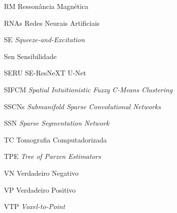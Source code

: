 \documentclass[
	12pt,				%
	openright,			%
	oneside,			%
	a4paper,			%
	chapter=TITLE,		%
	english,			%
	french,				%
	spanish,			%
	brazil				%
	]{abntex2}
\begin{document}
\begin{siglas}
    \item[RM] Ressonância Magnética
    \item[RNAs] Redes Neurais Artificiais
    \item[SE] \textit{Squeeze-and-Excitation}
    \item[Sen] Sensibilidade
    \item[SERU] SE-ResNeXT U-Net
    \item[SIFCM] \textit{Spatial Intuitionistic Fuzzy C-Means Clustering}
    \item[SSCNs] \textit{Submanifold Sparse Convolutional Networks}
    \item[SSN] \textit{Sparse Segmentation Network}
    \item[TC] Tomografia Computadorizada
    \item[TPE] \textit{Tree of Parzen Estimators}
    \item[VN] Verdadeiro Negativo
    \item[VP] Verdadeiro Positivo
    \item[VTP] \textit{Voxel-to-Point}
\end{siglas}

  
\end{document}
